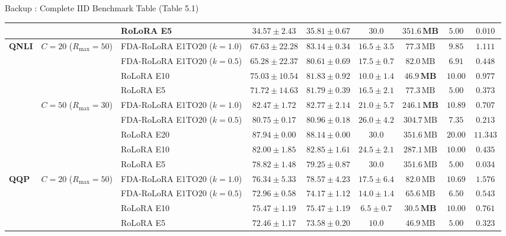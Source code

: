 \documentclass[aspectratio=169]{beamer}
\begin{document}
\begin{frame}[noframenumbering, label=backup_iid_table]{Backup : Complete IID Benchmark Table (Table 5.1)}
{\begin{tabular}{lllcccccc}
        & & RoLoRA E5 & $34.57 \pm 2.43$ & $35.81 \pm 0.67$ & $\mathbf{30.0}$ & $\mathbf{351.6\,\text{MB}}$ & $5.00$ & $0.010$ \\
        \midrule
        \multirow{9}{*}{\textbf{QNLI}} 
        & \multirow{4}{*}{$C=20$ ($R_{\max}=50$)} 
        & FDA-RoLoRA E1TO20 ($k=1.0$) & $67.63 \pm 22.28$ & $\mathbf{83.14 \pm 0.34}$ & $16.5 \pm 3.5$ & $77.3\,\text{MB}$ & $9.85$ & $1.111$ \\
        & & FDA-RoLoRA E1TO20 ($k=0.5$) & $65.28 \pm 22.37$ & $80.61 \pm 0.69$ & $17.5 \pm 0.7$ & $82.0\,\text{MB}$ & $6.91$ & $0.448$ \\
        & & RoLoRA E10 & $\mathbf{75.03 \pm 10.54}$ & $81.83 \pm 0.92$ & $\mathbf{10.0 \pm 1.4}$ & $\mathbf{46.9\,\text{MB}}$ & $10.00$ & $0.977$ \\
        & & RoLoRA E5 & $71.72 \pm 14.63$ & $81.79 \pm 0.39$ & $16.5 \pm 2.1$ & $77.3\,\text{MB}$ & $5.00$ & $0.373$ \\
        \cmidrule{2-9}
        & \multirow{5}{*}{$C=50$ ($R_{\max}=30$)} 
        & FDA-RoLoRA E1TO20 ($k=1.0$) & $82.47 \pm 1.72$ & $82.77 \pm 2.14$ & $\mathbf{21.0 \pm 5.7}$ & $\mathbf{246.1\,\text{MB}}$ & $10.89$ & $0.707$ \\
        & & FDA-RoLoRA E1TO20 ($k=0.5$) & $80.75 \pm 0.17$ & $80.96 \pm 0.18$ & $26.0 \pm 4.2$ & $304.7\,\text{MB}$ & $7.35$ & $0.213$ \\
        & & RoLoRA E20 & $\mathbf{87.94 \pm 0.00}$ & $\mathbf{88.14 \pm 0.00}$ & $30.0$ & $351.6\,\text{MB}$ & $20.00$ & $11.343$ \\
        & & RoLoRA E10 & $82.00 \pm 1.85$ & $82.85 \pm 1.61$ & $24.5 \pm 2.1$ & $287.1\,\text{MB}$ & $10.00$ & $0.435$ \\
        & & RoLoRA E5 & $78.82 \pm 1.48$ & $79.25 \pm 0.87$ & $30.0$ & $351.6\,\text{MB}$ & $5.00$ & $0.034$ \\
        \midrule
        \multirow{8}{*}{\textbf{QQP}} 
        & \multirow{4}{*}{$C=20$ ($R_{\max}=50$)} 
        & FDA-RoLoRA E1TO20 ($k=1.0$) & $\mathbf{76.34 \pm 5.33}$ & $\mathbf{78.57 \pm 4.23}$ & $17.5 \pm 6.4$ & $82.0\,\text{MB}$ & $10.69$ & $1.576$ \\
        & & FDA-RoLoRA E1TO20 ($k=0.5$) & $72.96 \pm 0.58$ & $74.17 \pm 1.12$ & $14.0 \pm 1.4$ & $65.6\,\text{MB}$ & $6.50$ & $0.543$ \\
        & & RoLoRA E10 & $75.47 \pm 1.19$ & $75.47 \pm 1.19$ & $\mathbf{6.5 \pm 0.7}$ & $\mathbf{30.5\,\text{MB}}$ & $10.00$ & $0.761$ \\
        & & RoLoRA E5 & $72.46 \pm 1.17$ & $73.58 \pm 0.20$ & $10.0$ & $46.9\,\text{MB}$ & $5.00$ & $0.323$ \\

\end{tabular}}
\end{frame}
\end{document}
